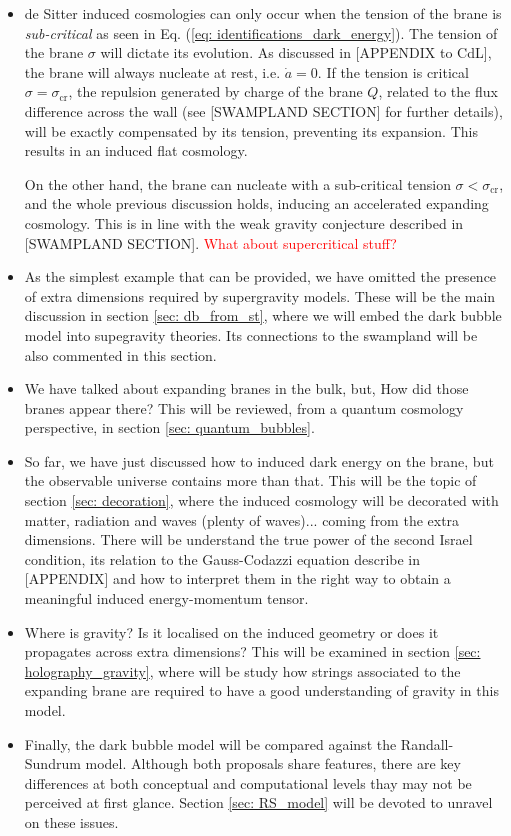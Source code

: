 \begin{itemize}
	\item de Sitter induced cosmologies can only occur when the tension of the brane is \textit{sub-critical} as seen in Eq. (\ref{eq: identifications_dark_energy}). The tension of the brane $\sigma$ will dictate its evolution. As discussed in [APPENDIX to CdL], the brane will always nucleate at rest, i.e. $\dot{a} = 0$. If the tension is critical $\sigma = \sigma_{\text{cr}}$, the repulsion generated by charge of the brane $Q$, related to the flux difference across the wall (see [SWAMPLAND SECTION] for further details), will be exactly compensated by its tension, preventing its expansion. This results in an induced flat cosmology.
	
	On the other hand, the brane can nucleate with a sub-critical tension $\sigma < \sigma_{\text{cr}}$, and the whole previous discussion holds, inducing an accelerated expanding cosmology. This is in line with the weak gravity conjecture described in [SWAMPLAND SECTION]. \textcolor{red}{What about supercritical stuff?}

	\item As the simplest example that can be provided, we have omitted the presence of extra dimensions required by supergravity models. These will be the main discussion in section \ref{sec: db_from_st}, where we will embed the dark bubble model into supegravity theories. Its connections to the swampland will be also commented in this section.
	\item We have talked about expanding branes in the bulk, but, How did those branes appear there? This will be reviewed, from a quantum cosmology perspective, in section \ref{sec: quantum_bubbles}.
	\item So far, we have just discussed how to induced dark energy on the brane, but the observable universe contains more than that. This will be the topic of section \ref{sec: decoration}, where the induced cosmology will be decorated with matter, radiation and waves (plenty of waves)... coming from the extra dimensions. There will be understand the true power of the second Israel condition, its relation to the Gauss-Codazzi equation describe in [APPENDIX] and how to interpret them in the right way to obtain a meaningful induced energy-momentum tensor.
	\item Where is gravity? Is it localised on the induced geometry or does it propagates across extra dimensions? This will be examined in section \ref{sec: holography_gravity}, where will be study how strings associated to the expanding brane are required to have a good understanding of gravity in this model.
	\item Finally, the dark bubble model will be compared against the Randall-Sundrum model. Although both proposals share features, there are key differences at both conceptual and computational levels thay may not be perceived at first glance. Section \ref{sec: RS_model} will be devoted to unravel on these issues.
\end{itemize}